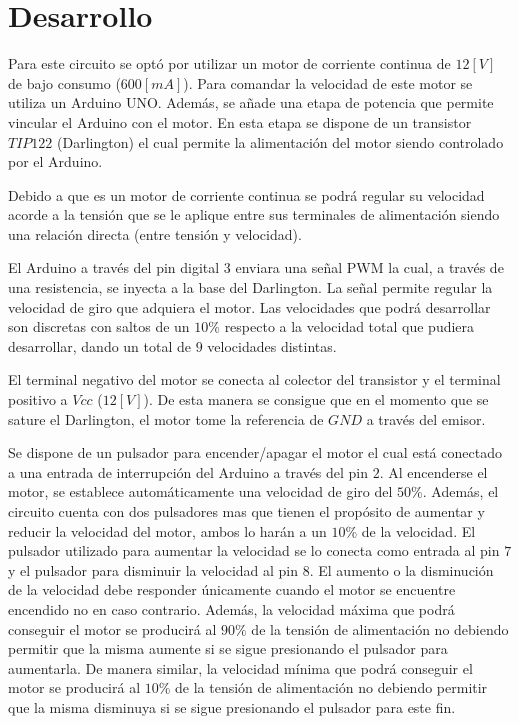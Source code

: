 \documentclass[a4paper, 12pt]{article}
\begin{document}
\newpage
{}

\section{Desarrollo}

Para este circuito se optó por utilizar un motor de corriente continua de $12[V]$ de bajo consumo ($600[mA]$). Para comandar la velocidad de este motor se utiliza un Arduino UNO. Además, se añade una etapa de potencia que permite vincular el Arduino con el motor. En esta etapa se dispone de un transistor $TIP122$ (Darlington) el cual permite la alimentación del motor siendo controlado por el Arduino.

Debido a que es un motor de corriente continua se podrá regular su velocidad acorde a la tensión que se le aplique entre sus terminales de alimentación siendo una relación directa (entre tensión y velocidad).

El Arduino a través del pin digital $3$ enviara una señal PWM la cual, a través de una resistencia, se inyecta a la base del Darlington. La señal permite regular la velocidad de giro que adquiera el motor. Las velocidades que podrá desarrollar son discretas con saltos de un $10\%$ respecto a la velocidad total que pudiera desarrollar, dando un total de $9$ velocidades distintas.

El terminal negativo del motor se conecta al colector del transistor y el terminal positivo a $Vcc$ ($12[V]$). De esta manera se consigue que en el momento que se sature el Darlington, el motor tome la referencia de $GND$ a través del emisor.

Se dispone de un pulsador para encender/apagar el motor el cual está conectado a una entrada de interrupción del Arduino a través del pin $2$. Al encenderse el motor, se establece automáticamente una velocidad de giro del $50\%$. Además, el circuito cuenta con dos pulsadores mas que tienen el propósito de aumentar y reducir la velocidad del motor, ambos lo harán a un $10\%$ de la velocidad. El pulsador utilizado para aumentar la velocidad se lo conecta como entrada al pin $7$ y el pulsador para disminuir la velocidad al pin $8$. El aumento o la disminución de la velocidad debe responder únicamente cuando el motor se encuentre encendido no en caso contrario. Además, la velocidad máxima que podrá conseguir el motor se producirá al $90\%$ de la tensión de alimentación no debiendo permitir que la misma aumente si se sigue presionando el pulsador para aumentarla. De manera similar, la velocidad mínima que podrá conseguir el motor se producirá al $10\%$ de la tensión de alimentación no debiendo permitir que la misma disminuya si se sigue presionando el pulsador para este fin.
\end{document}
